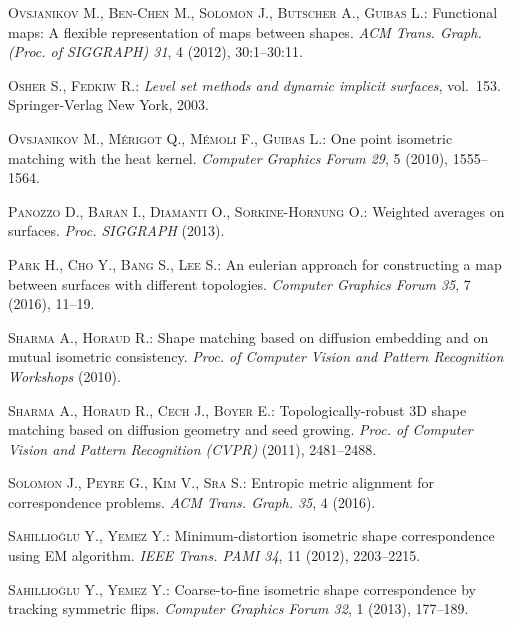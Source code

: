 \documentclass{egpubl}
\begin{document}
\begin{thebibliography}{\uppercase{vKZHCO11}}
\textsc{Ovsjanikov M., Ben-Chen M., Solomon J., Butscher A., Guibas L.}:
\newblock Functional maps: A flexible representation of maps between shapes.
\newblock \emph{ACM Trans. Graph. (Proc. of SIGGRAPH) 31}, 4 (2012),
  30:1--30:11.

\textsc{Osher S., Fedkiw R.}:
\newblock \emph{Level set methods and dynamic implicit surfaces}, vol.~153.
\newblock Springer-Verlag New York, 2003.

\textsc{Ovsjanikov M., M\'{e}rigot Q., M\'{e}moli F., Guibas L.}:
\newblock One point isometric matching with the heat kernel.
\newblock \emph{Computer Graphics Forum 29}, 5 (2010), 1555--1564.

\textsc{Panozzo D., Baran I., Diamanti O., Sorkine-Hornung O.}:
\newblock Weighted averages on surfaces.
\newblock \emph{Proc. SIGGRAPH} (2013).

\textsc{Park H., Cho Y., Bang S., Lee S.}:
\newblock An eulerian approach for constructing a map between surfaces with
  different topologies.
\newblock \emph{Computer Graphics Forum 35}, 7 (2016), 11--19.

\textsc{Sharma A., Horaud R.}:
\newblock Shape matching based on diffusion embedding and on mutual isometric
  consistency.
\newblock \emph{Proc. of Computer Vision and Pattern Recognition Workshops}
  (2010).

\textsc{Sharma A., Horaud R., Cech J., Boyer E.}:
\newblock Topologically-robust {3D} shape matching based on diffusion geometry
  and seed growing.
\newblock \emph{Proc. of Computer Vision and Pattern Recognition (CVPR)}
  (2011), 2481--2488.

\textsc{Solomon J., Peyre G., Kim V., Sra S.}:
\newblock Entropic metric alignment for correspondence problems.
\newblock \emph{ACM Trans. Graph. 35}, 4 (2016).

\textsc{Sahillio\u{g}lu Y., Yemez Y.}:
\newblock Minimum-distortion isometric shape correspondence using {EM}
  algorithm.
\newblock \emph{IEEE Trans. PAMI 34}, 11 (2012), 2203--2215.

\textsc{Sahillio\u{g}lu Y., Yemez Y.}:
\newblock Coarse-to-fine isometric shape correspondence by tracking symmetric
  flips.
\newblock \emph{Computer Graphics Forum 32}, 1 (2013), 177--189.


\end{thebibliography}
\end{document}

